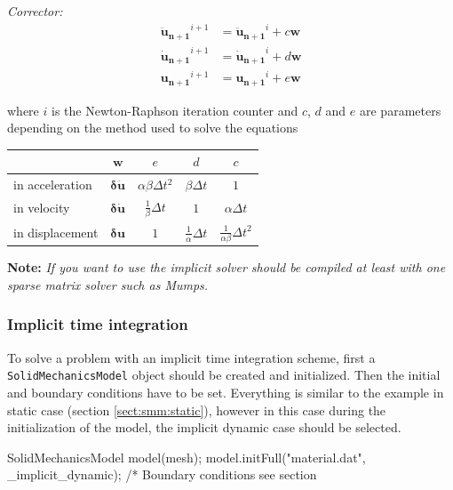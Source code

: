 \documentclass[a4paper,11pt]{book}
\newcommand{\akantu}{{\cminfamily{\textbf{Akantu}}}\xspace}
\newcommand{\code}[1]{\texttt{#1}}
\newcommand{\note}[1]{\textbf{Note: }\textit{#1}}
\renewcommand{\vec}[1]{\ensuremath{\boldsymbol{#1}}}
\begin{document}
\noindent\textit{Corrector:}
\begin{align}
  \vec{\ddot{u}_{n+1}}^{i+1} &= \vec{\ddot{u}_{n+1}}^{i} + c \vec{w} \\
  \vec{\dot{u}_{n+1}}^{i+1} &= \vec{\dot{u}_{n+1}}^{i} + d \vec{w} \\
  \vec{u_{n+1}}^{i+1} &= \vec{u_{n+1}}^{i} + e \vec{w}
\end{align}

where  $i$ is  the Newton-Raphson  iteration counter  and $c$,  $d$ and  $e$ are
parameters depending on the method used to solve the equations

\begin{center}
  \begin{tabular}{lcccc}
    \toprule
    & $\vec{w}$ & $e$ & $d$ & $c$\\
    \midrule
    in  acceleration  &$ \vec{\delta  \ddot{u}}$  &  $\alpha  \beta \Delta  t^2$
    &$\beta \Delta t$ &$1$\\
    in velocity  & $ \vec{\delta \dot{u}}$&  $\frac{1}{\beta} \Delta t$  & $1$ &
    $\alpha \Delta t$\\
    in displacement  &$\vec{\delta u}$  & $ 1$  & $\frac{1}{\alpha} \Delta  t$ &
    $\frac{1}{\alpha \beta} \Delta t^2$\\
    \bottomrule
  \end{tabular}
\end{center}

\note{If you want to use the implicit solver \akantu should be compiled at least
  with one sparse matrix solver such as Mumps\cite{mumps}.}


\subsubsection{Implicit time integration}
To  solve  a  problem with  an  implicit  time  integration scheme,  first  a
\code{SolidMechanicsModel} object  should be created and  initialized.  Then the
initial and  boundary conditions have to  be set.  Everything is  similar to the
example  in static case  (section \ref{sect:smm:static}),  however in  this case
during  the initialization of  the model,  the implicit  dynamic case  should be
selected.

\begin{cpp}
  SolidMechanicsModel model(mesh);
  model.initFull("material.dat", _implicit_dynamic);
  /* Boundary conditions see section %
\end{cpp}
\end{document}
